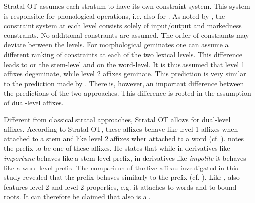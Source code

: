 Stratal OT assumes each stratum to have its own constraint system. This system is responsible for phonological operations, i.e. also for . As noted by \citet[5]{Kiparsky.2015}, the constraint system at each level consists solely of input/output and markedness constraints. No additional constraints are assumed. The order of constraints may deviate between the levels. For morphological geminates one can assume a different ranking of constraints at each of the two lexical levels. This difference leads to  on the stem-level and  on the word-level. It is thus assumed that level 1 affixes degeminate, while level 2 affixes geminate. This prediction is very similar to the prediction made by . There is, however, an important difference between the predictions of the two approaches. This difference is rooted in the assumption of dual-level affixes.

Different from classical stratal approaches, Stratal OT allows for dual-level affixes. According to Stratal OT, these affixes behave like level 1 affixes when attached to a stem and like level 2 affixes when attached to a word (cf. \citealt[15, 33]{BermudezOtero.2017}). 
\citet[33]{BermudezOtero.2017} notes the prefix  to be one of these affixes. He states that while in derivatives like \textit{importune}  behaves like a stem-level prefix, in derivatives like \textit{impolite} it behaves like a word-level prefix. The comparison of the five affixes investigated in this study revealed that the prefix  behaves similarly to the prefix  (cf. ). Like ,  also features level 2 and level 2 properties, e.g. it attaches to words and to bound roots. It can therefore be claimed that  also is a .  



